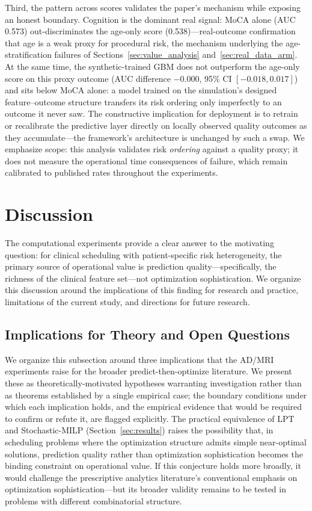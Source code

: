 \documentclass[11pt,a4paper]{article}
\begin{document}
{Third, the pattern across scores validates the paper's mechanism while exposing an honest boundary. Cognition is the dominant real signal: MoCA alone (AUC 0.573) out-discriminates the age-only score (0.538)---real-outcome confirmation that age is a weak proxy for procedural risk, the mechanism underlying the age-stratification failures of Sections~\ref{sec:value_analysis} and~\ref{sec:real_data_arm}. At the same time, the synthetic-trained GBM does not outperform the age-only score on this proxy outcome (AUC difference $-0.000$, 95\% CI $[-0.018, 0.017]$) and sits below MoCA alone: a model trained on the simulation's designed feature--outcome structure transfers its risk ordering only imperfectly to an outcome it never saw. The constructive implication for deployment is to retrain or recalibrate the predictive layer directly on locally observed quality outcomes as they accumulate---the framework's architecture is unchanged by such a swap. We emphasize scope: this analysis validates risk \textit{ordering} against a quality proxy; it does not measure the operational time consequences of failure, which remain calibrated to published rates throughout the experiments.
}

\section{Discussion}
\label{sec:discussion}

The computational experiments provide a clear answer to the motivating question: for clinical scheduling with patient-specific risk heterogeneity, the primary source of operational value is prediction quality---specifically, the richness of the clinical feature set---not optimization sophistication. We organize this discussion around the implications of this finding for research and practice, limitations of the current study, and directions for future research.

\subsection{Implications for Theory and Open Questions}
\label{sec:theory}

We organize this subsection around three implications that the AD/MRI experiments raise for the broader predict-then-optimize literature. We present these as theoretically-motivated hypotheses warranting investigation rather than as theorems established by a single empirical case; the boundary conditions under which each implication holds, and the empirical evidence that would be required to confirm or refute it, are flagged explicitly. The practical equivalence of LPT and Stochastic-MILP (Section~\ref{sec:results}) raises the possibility that, in scheduling problems where the optimization structure admits simple near-optimal solutions, prediction quality rather than optimization sophistication becomes the binding constraint on operational value. If this conjecture holds more broadly, it would challenge the prescriptive analytics literature's conventional emphasis on optimization sophistication---but its broader validity remains to be tested in problems with different combinatorial structure.
\end{document}
